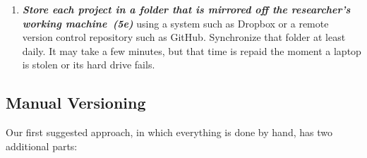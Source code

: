 \documentclass[10pt,letterpaper]{article}
\newcommand{\withurl}[2]{{#1}}
\newcommand{\practice}[2]{\textbf{\emph{{#2}~({#1})}}}
\begin{document}
\begin{enumerate}
\item

  \practice{5e}{Store each project in a folder that is mirrored off
  the researcher's working machine} using a system such as
  \withurl{Dropbox}{http://dropbox.com} or a remote version control
  repository such as \withurl{GitHub}{http://github.com}.  Synchronize
  that folder at least daily. It may take a few minutes, but that time
  is repaid the moment a laptop is stolen or its hard drive fails.

\end{enumerate}

\subsection*{Manual Versioning}

Our first suggested approach, in which everything is done by hand, has
two additional parts:
\end{document}

